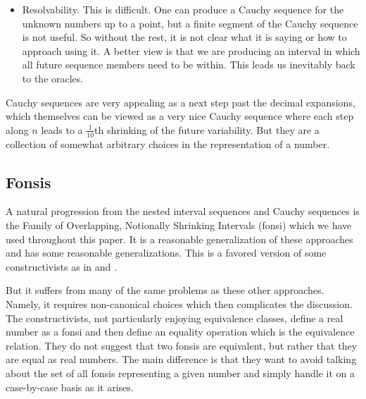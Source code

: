 \documentclass[12pt]{article}
\begin{document}
\begin{itemize}
    \item Resolvability. This is difficult. One can produce a Cauchy sequence for the unknown numbers up to a point, but a finite segment of the Cauchy sequence is not useful. So without the rest, it is not clear what it is saying or how to approach using it. A better view is that we are producing an interval in which all future sequence members need to be within. This leads us inevitably back to the oracles. 
\end{itemize}

Cauchy sequences are very appealing as a next step past the decimal expansions, which themselves can be viewed as a very nice Cauchy sequence where each step along $n$ leads to a $\frac{1}{10}$th shrinking of the future variability. But they are a collection of somewhat arbitrary choices in the representation of a number. 

\subsection{Fonsis}

A natural progression from the nested interval sequences and Cauchy sequences is the Family of Overlapping, Notionally Shrinking Intervals (fonsi) which we have used throughout this paper. It is a reasonable generalization of these approaches and has some reasonable generalizations. This is a favored version of some constructivists as in \cite{bridger} and \cite{bridges}. 

But it suffers from many of the same problems as these other approaches. Namely, it requires non-canonical choices which then complicates the discussion. The constructivists, not particularly enjoying equivalence classes, define a real number as a fonsi and then define an equality operation which is the equivalence relation. They do not suggest that two fonsis are equivalent, but rather that they are equal as real numbers. The main difference is that they want to avoid talking about the set of all fonsis representing a given number and simply handle it on a case-by-case basis as it arises. 
\end{document}
